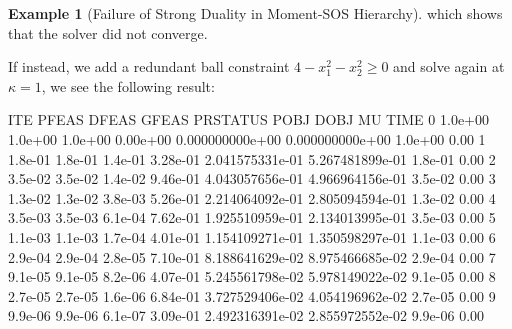 \documentclass[
]{book}
\newenvironment{Shaded}{\begin{snugshade}}{\end{snugshade}}
\newcommand{\FloatTok}[1]{\textcolor[rgb]{0.00,0.00,0.81}{#1}}
\newcommand{\VariableTok}[1]{\textcolor[rgb]{0.00,0.00,0.00}{#1}}
\theoremstyle{definition}
\theoremstyle{definition}
\newtheorem{example}{Example}[chapter]
\theoremstyle{definition}
\theoremstyle{definition}
\theoremstyle{remark}
\begin{document}
\begin{example}[Failure of Strong Duality in Moment-SOS Hierarchy]
which shows that the solver did not converge.

If instead, we add a redundant ball constraint \(4 - x_1^2 - x_2^2 \geq 0\) and solve again at \(\kappa=1\), we see the following result:

\begin{Shaded}
\begin{Highlighting}[]
\VariableTok{ITE} \VariableTok{PFEAS}    \VariableTok{DFEAS}    \VariableTok{GFEAS}    \VariableTok{PRSTATUS}   \VariableTok{POBJ}              \VariableTok{DOBJ}              \VariableTok{MU}       \VariableTok{TIME}  
\FloatTok{0}   \FloatTok{1.0e+00}  \FloatTok{1.0e+00}  \FloatTok{1.0e+00}  \FloatTok{0.00e+00}   \FloatTok{0.000000000e+00}   \FloatTok{0.000000000e+00}   \FloatTok{1.0e+00}  \FloatTok{0.00}  
\FloatTok{1}   \FloatTok{1.8e{-}01}  \FloatTok{1.8e{-}01}  \FloatTok{1.4e{-}01}  \FloatTok{3.28e{-}01}   \FloatTok{2.041575331e{-}01}   \FloatTok{5.267481899e{-}01}   \FloatTok{1.8e{-}01}  \FloatTok{0.00}  
\FloatTok{2}   \FloatTok{3.5e{-}02}  \FloatTok{3.5e{-}02}  \FloatTok{1.4e{-}02}  \FloatTok{9.46e{-}01}   \FloatTok{4.043057656e{-}01}   \FloatTok{4.966964156e{-}01}   \FloatTok{3.5e{-}02}  \FloatTok{0.00}  
\FloatTok{3}   \FloatTok{1.3e{-}02}  \FloatTok{1.3e{-}02}  \FloatTok{3.8e{-}03}  \FloatTok{5.26e{-}01}   \FloatTok{2.214064092e{-}01}   \FloatTok{2.805094594e{-}01}   \FloatTok{1.3e{-}02}  \FloatTok{0.00}  
\FloatTok{4}   \FloatTok{3.5e{-}03}  \FloatTok{3.5e{-}03}  \FloatTok{6.1e{-}04}  \FloatTok{7.62e{-}01}   \FloatTok{1.925510959e{-}01}   \FloatTok{2.134013995e{-}01}   \FloatTok{3.5e{-}03}  \FloatTok{0.00}  
\FloatTok{5}   \FloatTok{1.1e{-}03}  \FloatTok{1.1e{-}03}  \FloatTok{1.7e{-}04}  \FloatTok{4.01e{-}01}   \FloatTok{1.154109271e{-}01}   \FloatTok{1.350598297e{-}01}   \FloatTok{1.1e{-}03}  \FloatTok{0.00}  
\FloatTok{6}   \FloatTok{2.9e{-}04}  \FloatTok{2.9e{-}04}  \FloatTok{2.8e{-}05}  \FloatTok{7.10e{-}01}   \FloatTok{8.188641629e{-}02}   \FloatTok{8.975466685e{-}02}   \FloatTok{2.9e{-}04}  \FloatTok{0.00}  
\FloatTok{7}   \FloatTok{9.1e{-}05}  \FloatTok{9.1e{-}05}  \FloatTok{8.2e{-}06}  \FloatTok{4.07e{-}01}   \FloatTok{5.245561798e{-}02}   \FloatTok{5.978149022e{-}02}   \FloatTok{9.1e{-}05}  \FloatTok{0.00}  
\FloatTok{8}   \FloatTok{2.7e{-}05}  \FloatTok{2.7e{-}05}  \FloatTok{1.6e{-}06}  \FloatTok{6.84e{-}01}   \FloatTok{3.727529406e{-}02}   \FloatTok{4.054196962e{-}02}   \FloatTok{2.7e{-}05}  \FloatTok{0.00}  
\FloatTok{9}   \FloatTok{9.9e{-}06}  \FloatTok{9.9e{-}06}  \FloatTok{6.1e{-}07}  \FloatTok{3.09e{-}01}   \FloatTok{2.492316391e{-}02}   \FloatTok{2.855972552e{-}02}   \FloatTok{9.9e{-}06}  \FloatTok{0.00}  

\end{Highlighting}
\end{Shaded}
\end{example}
\end{document}
